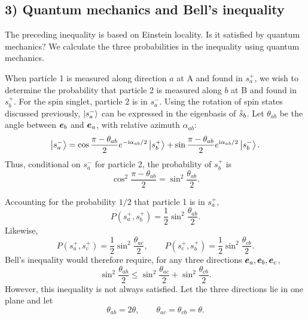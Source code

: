 \subsection*{3) Quantum mechanics and Bell's inequality}
The preceding inequality is based on Einstein locality. Is it satisfied by quantum mechanics? We calculate the three probabilities in the inequality using quantum mechanics.

When particle 1 is measured along direction $a$ at A and found in $s_a^+$, we wish to determine the probability that particle 2 is measured along $b$ at B and found in $s_b^+$. For the spin singlet, particle 2 is in $s_a^-$. Using the rotation of spin states discussed previously, $\left|s_a^-\right\rangle$ can be expressed in the eigenbasis of $\hat{s}_b$. Let $\theta_{ab}$ be the angle between $\bm{e}_b$ and $\bm{e}_a$, with relative azimuth $\alpha_{ab}$:
\begin{equation}
\left|s_a^-\right\rangle=\cos\frac{\pi-\theta_{ab}}2e^{-\mathrm{i}\alpha_{ab}/2}\left|s_b^+\right\rangle
+\sin\frac{\pi-\theta_{ab}}2e^{\mathrm{i}\alpha_{ab}/2}\left|s_b^-\right\rangle.
\end{equation}
Thus, conditional on $s_a^-$ for particle 2, the probability of $s_b^+$ is
\begin{equation}
\cos^2\frac{\pi-\theta_{ab}}2=\sin^2\frac{\theta_{ab}}2.
\end{equation}

Accounting for the probability $1/2$ that particle 1 is in $s_a^+$,
\begin{equation}
\boxed{P(s_a^+,s_b^+)=\frac12\sin^2\frac{\theta_{ab}}2.}
\end{equation}
Likewise,
\begin{equation}
P(s_a^+,s_c^+)=\frac12\sin^2\frac{\theta_{ac}}2,\qquad
P(s_c^+,s_b^+)=\frac12\sin^2\frac{\theta_{cb}}2.
\end{equation}
Bell's inequality would therefore require, for any three directions $\bm{e}_a,\bm{e}_b,\bm{e}_c$,
\begin{equation}
\boxed{\sin^2\frac{\theta_{ab}}2\le
\sin^2\frac{\theta_{ac}}2+\sin^2\frac{\theta_{cb}}2.}
\end{equation}
However, this inequality is not always satisfied. Let the three directions lie in one plane and let
\begin{equation}
\theta_{ab}=2\theta,\qquad\theta_{ac}=\theta_{cb}=\theta.
\end{equation}
\begin{center}
\end{center}
